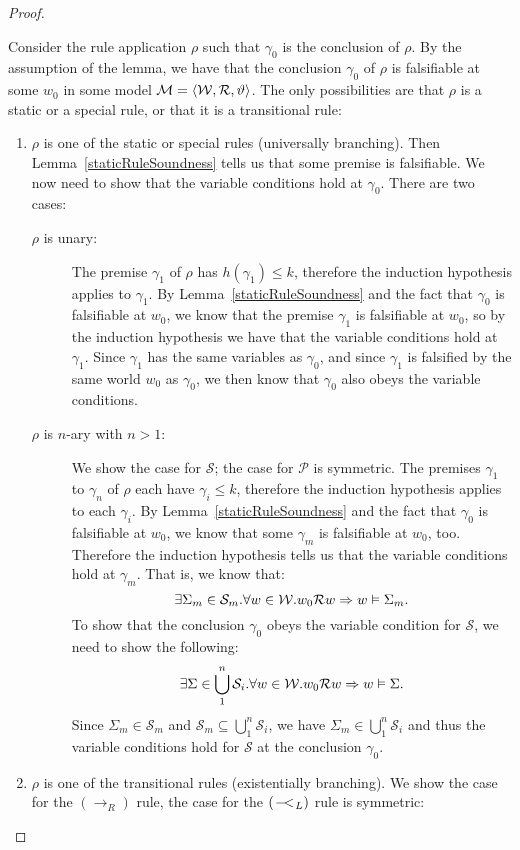 \documentclass{llncs}
\numberwithin{equation}{section}
\newcommand{\Pred}{{\mathcal{P}}}
\newcommand{\Succ}{{\mathcal{S}}}
\newcommand{\Imp}{\rightarrow}
\newcommand{\Force}{\vDash}
\newcommand{\WeakImp}{
\begin{picture}(10,10)
     \put(1,0){$-$}
     \put(7,0){$<$}
   \end{picture}
   \;\; 
}
\newcommand{\MetaImp}{\Rightarrow}
\newcommand{\mycal}[1]{
        {\cal{#1}}
}
\newcommand{\Model}{
        \mycal{M}=\langle \mycal{W}, \mycal{R}, \vartheta \rangle
}
\newcommand{\ImpRightRule}{({\Imp_R})}
\newcommand{\WeakImpLeftRule}{({\WeakImp_L})}
\begin{document}
\begin{proof}
\begin{description}
	Consider the rule application $\rho$ such that $\gamma_0$ is the conclusion of $\rho$. By the assumption of the lemma, we have that the conclusion $\gamma_0$ of $\rho$ is falsifiable at some $w_0$ in some model $\Model$. The only possibilities are that $\rho$ is a static or a special rule, or that it is a transitional rule:
	\begin{enumerate}
		\item $\rho$ is one of the static or special rules (universally branching). Then Lemma~\ref{staticRuleSoundness} tells us that some premise is falsifiable. We now need to show that the variable conditions hold at $\gamma_0$. There are two cases:
		\begin{description}
			\item[$\rho$ is unary:]
			The premise $\gamma_1$ of $\rho$ has $h(\gamma_1) \leq k$, therefore the induction hypothesis applies to $\gamma_1$. By Lemma~\ref{staticRuleSoundness} and the fact that $\gamma_0$ is falsifiable at $w_0$, we know that the premise $\gamma_1$ is falsifiable at $w_0$, so by the induction hypothesis we have that the variable conditions hold at $\gamma_1$. Since $\gamma_1$ has the same variables as $\gamma_0$, and since $\gamma_1$ is falsified by the same world $w_0$ as $\gamma_0$, we then know that $\gamma_0$ also obeys the variable conditions.
			\item[$\rho$ is $n$-ary with $n > 1$:] We show the case for $\Succ$; the case for $\Pred$ is symmetric. The premises $\gamma_1$ to $\gamma_n$ of $\rho$ each have $\gamma_i \leq k$, therefore the induction hypothesis applies to each $\gamma_i$. By Lemma~\ref{staticRuleSoundness} and the fact that $\gamma_0$ is falsifiable at $w_0$, we know that some $\gamma_m$ is falsifiable at $w_0$, too. Therefore the induction hypothesis tells us that the variable conditions hold at $\gamma_m$. That is, we know that:
	$$\exists \Sigma_m \in \Succ_m . \forall w \in \mycal{W} . w_0 \mycal{R} w \MetaImp w \Force \Sigma_m.$$
	To show that the conclusion $\gamma_0$ obeys the variable condition for $\Succ$, we need to show the following:
	$$\exists \Sigma \in \bigcup_1^n \Succ_i . \forall w \in \mycal{W} . w_0 \mycal{R} w \MetaImp w \Force \Sigma.$$
	Since $\Sigma_m \in \Succ_m$ and $\Succ_m \subseteq \bigcup_1^n \Succ_i$, we have $\Sigma_m \in \bigcup_1^n \Succ_i$ and thus  the variable conditions hold for $\Succ$ at the conclusion $\gamma_0$.
			\end{description}		
		\item $\rho$ is one of the transitional rules (existentially branching).
We show the case for the $\ImpRightRule$ rule, the case for the $\WeakImpLeftRule$ rule is symmetric:


\end{enumerate}
\end{description}
\end{proof}
\end{document}
